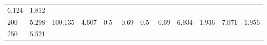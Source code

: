 \documentclass{article}
\begin{document}
\begin{longtable}[]{@{}llllllllllll@{}}
\begin{minipage}[t]{0.06\columnwidth}
6.124\strut
\end{minipage} & \begin{minipage}[t]{0.09\columnwidth}\raggedright\strut
1.812\strut
\end{minipage}\tabularnewline
\begin{minipage}[t]{0.03\columnwidth}\raggedright\strut
200\strut
\end{minipage} & \begin{minipage}[t]{0.06\columnwidth}\raggedright\strut
5.298\strut
\end{minipage} & \begin{minipage}[t]{0.06\columnwidth}\raggedright\strut
100.135\strut
\end{minipage} & \begin{minipage}[t]{0.08\columnwidth}\raggedright\strut
4.607\strut
\end{minipage} & \begin{minipage}[t]{0.03\columnwidth}\raggedright\strut
0.5\strut
\end{minipage} & \begin{minipage}[t]{0.06\columnwidth}\raggedright\strut
-0.69\strut
\end{minipage} & \begin{minipage}[t]{0.03\columnwidth}\raggedright\strut
0.5\strut
\end{minipage} & \begin{minipage}[t]{0.06\columnwidth}\raggedright\strut
-0.69\strut
\end{minipage} & \begin{minipage}[t]{0.06\columnwidth}\raggedright\strut
6.934\strut
\end{minipage} & \begin{minipage}[t]{0.08\columnwidth}\raggedright\strut
1.936\strut
\end{minipage} & \begin{minipage}[t]{0.06\columnwidth}\raggedright\strut
7.071\strut
\end{minipage} & \begin{minipage}[t]{0.09\columnwidth}\raggedright\strut
1.956\strut
\end{minipage}\tabularnewline
\begin{minipage}[t]{0.03\columnwidth}\raggedright\strut
250\strut
\end{minipage} & \begin{minipage}[t]{0.06\columnwidth}\raggedright\strut
5.521\strut
\end{minipage} & \begin{minipage}[t]{0.06\columnwidth}\raggedright\strut

\end{minipage}
\end{longtable}
\end{document}
